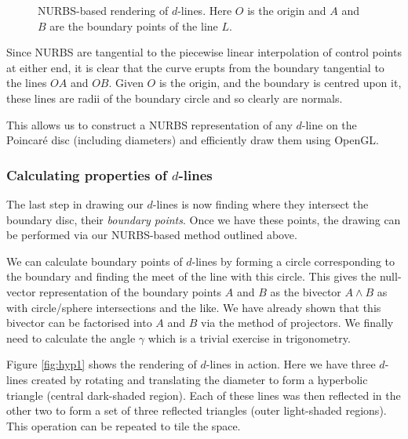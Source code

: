 \begin{figure} \centering
{}
\caption{NURBS-based rendering of $d$-lines. Here $O$ is the origin and
$A$ and $B$ are the boundary points of the line $L$.}
\label{fig:nurbs}
\end{figure}

Since NURBS are tangential to the piecewise linear interpolation of control 
points
at either end, it is clear that the curve erupts from the boundary
tangential to the lines $OA$ and $OB$. Given $O$ is the origin, and the
boundary is centred upon it, these lines are radii of the boundary
circle and so clearly are normals.

This allows us to construct a NURBS representation of any $d$-line
on the Poincar\'e disc (including diameters) and efficiently draw them
using OpenGL. 

\subsubsection{Calculating properties of $d$-lines}

The last step in drawing our $d$-lines is now finding where they intersect
the boundary disc, their \emph{boundary points}. 
Once we have these points, the drawing can be performed
via our NURBS-based method outlined above.

We can calculate boundary points of $d$-lines
by forming a circle 
corresponding to the boundary and finding the 
meet of the line with this circle. This gives the null-vector
representation of the boundary points $A$ and $B$ as the
bivector $A \wedge B$ as with circle/sphere intersections and the like.
We have already shown that this bivector can be factorised into $A$ and 
$B$ via the method of projectors.
We finally need to calculate the angle $\gamma$ which is a trivial
exercise in trigonometry.

Figure
\ref{fig:hyp1} shows the rendering of $d$-lines in action.
Here we have three $d$-lines created by rotating and translating the
diameter to form a hyperbolic triangle (central dark-shaded
region). Each of these lines was then reflected in the other two to form 
a set of three reflected triangles (outer light-shaded regions). This
operation can be repeated to tile the space.

